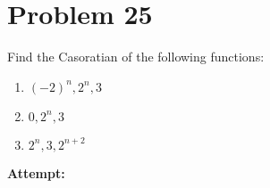 \documentclass[12pt,letterpaper]{article}
\theoremstyle{definition}
\begin{document}
\newpage

\section*{Problem 25}

Find the Casoratian of the following functions:

\begin{enumerate}
    \item $(-2)^n,2^n,3$
    \item $0,2^n,3$
    \item $2^n,3,2^{n+2}$
\end{enumerate}



    
  \textbf{Attempt:}
    \begin{changemargin}{.5cm}{0cm}
    

\end{changemargin}
\end{document}
